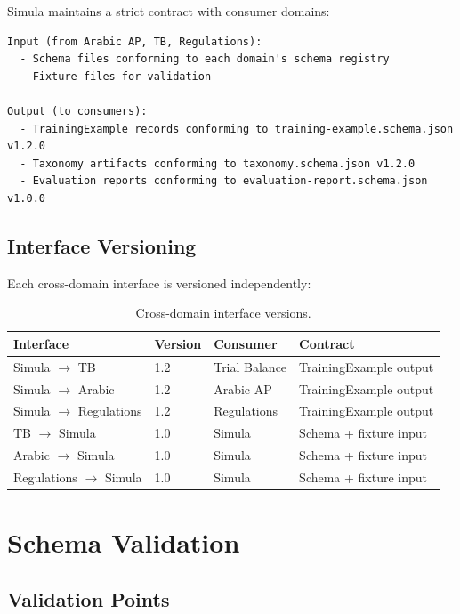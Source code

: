 Simula maintains a strict contract with consumer domains:

\begin{lstlisting}[basicstyle=\ttfamily\small,caption={Cross-domain interface contract.}]
Input (from Arabic AP, TB, Regulations):
  - Schema files conforming to each domain's schema registry
  - Fixture files for validation

Output (to consumers):
  - TrainingExample records conforming to training-example.schema.json v1.2.0
  - Taxonomy artifacts conforming to taxonomy.schema.json v1.2.0
  - Evaluation reports conforming to evaluation-report.schema.json v1.0.0
\end{lstlisting}

\subsection{Interface Versioning}

Each cross-domain interface is versioned independently:

\begin{table}[htbp]
\centering
\caption{Cross-domain interface versions.}
\label{tab:interface-versions}
\footnotesize
\begin{tabularx}{\textwidth}{@{}l l l X@{}}
\toprule
\textbf{Interface} & \textbf{Version} & \textbf{Consumer} & \textbf{Contract} \\
\midrule
Simula $\to$ TB & 1.2 & Trial Balance & TrainingExample output \\
Simula $\to$ Arabic & 1.2 & Arabic AP & TrainingExample output \\
Simula $\to$ Regulations & 1.2 & Regulations & TrainingExample output \\
TB $\to$ Simula & 1.0 & Simula & Schema + fixture input \\
Arabic $\to$ Simula & 1.0 & Simula & Schema + fixture input \\
Regulations $\to$ Simula & 1.0 & Simula & Schema + fixture input \\
\bottomrule
\end{tabularx}
\end{table}

\section{Schema Validation}

\subsection{Validation Points}

